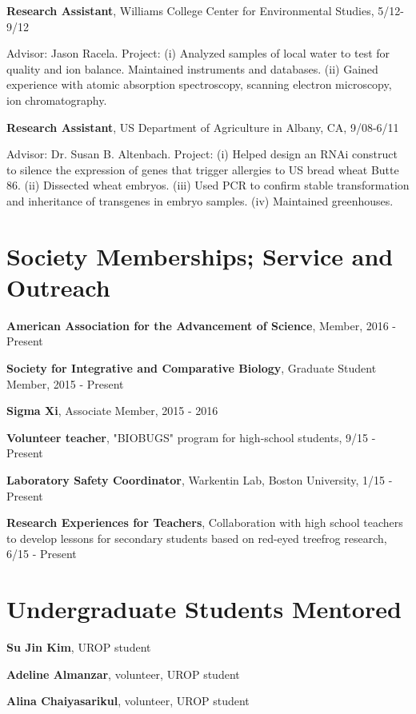 \documentclass[margin,line]{res}
\begin{document}
\begin{resume}
\vspace{-.1cm}
{\bf Research Assistant},  Williams College Center for Environmental Studies, 5/12-9/12

\vspace{-.43cm}
{Advisor: Jason Racela. Project: (i) Analyzed samples of local water to test for quality and ion balance. Maintained instruments and databases. (ii) Gained experience with atomic absorption spectroscopy, scanning electron microscopy, ion chromatography.}

\vspace{-.1cm}
{\bf Research Assistant},  US Department of Agriculture in Albany, CA, 9/08-6/11

\vspace{-.43cm}
{Advisor: Dr. Susan B. Altenbach. Project: (i) Helped design an RNAi construct to silence the expression of genes that trigger allergies to US bread wheat Butte 86. (ii) Dissected wheat embryos. (iii) Used PCR to confirm stable transformation and inheritance of transgenes in embryo samples. (iv) Maintained greenhouses.}

\section{\sc Society Memberships; Service and Outreach}

{\bf American Association for the Advancement of Science}, Member, 2016 - Present 

{\bf Society for Integrative and Comparative Biology}, Graduate Student Member, 2015 - Present 

{\bf Sigma Xi},  Associate Member, 2015 - 2016 

{\bf Volunteer teacher},  "BIOBUGS" program for high-school students, 9/15 - Present 

{\bf Laboratory Safety Coordinator},  Warkentin Lab, Boston University, 1/15 - Present 

{\bf Research Experiences for Teachers},  Collaboration with high school teachers to develop lessons for secondary students based on red-eyed treefrog research, 6/15 - Present

\section{\sc Undergraduate Students Mentored}

{\bf Su Jin Kim}, UROP student

{\bf Adeline Almanzar}, volunteer, UROP student

{\bf Alina Chaiyasarikul}, volunteer, UROP student

\end{resume}
\end{document}
